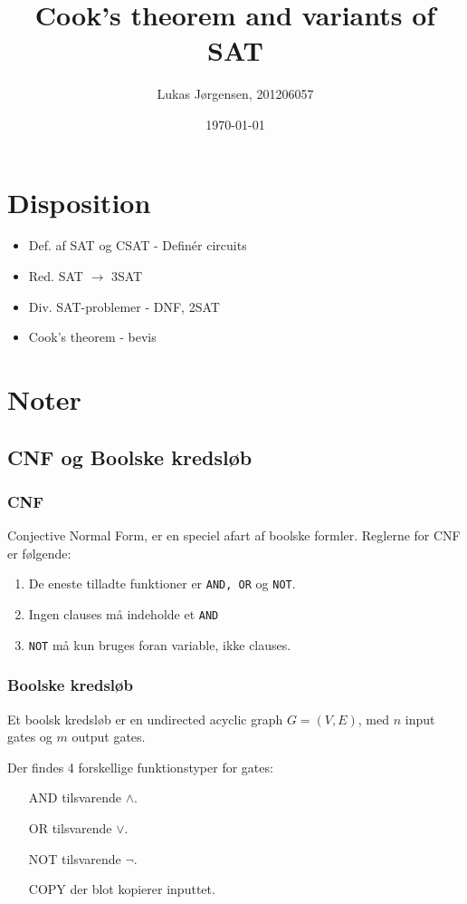 \documentclass[danish,a4paper,article,12pt]{article}
\title{Cook's theorem and variants of SAT}
\author{Lukas Jørgensen, 201206057
	}
\date{\today}
\begin{document}
\maketitle

\section{Disposition}
\begin{itemize}
\item Def. af SAT og CSAT - Definér circuits
\item Red. SAT $\rightarrow$ 3SAT
\item Div. SAT-problemer - DNF, 2SAT
\item Cook's theorem - bevis
\end{itemize}

\section{Noter}
\subsection{CNF og Boolske kredsløb}

\subsubsection{CNF}
Conjective Normal Form, er en speciel afart af boolske formler. Reglerne for CNF er følgende:

\begin{enumerate}
\item De eneste tilladte funktioner er \texttt{AND, OR} og \texttt{NOT}.
\item Ingen clauses må indeholde et \texttt{AND}
\item \texttt{NOT} må kun bruges foran variable, ikke clauses.
\end{enumerate}

\subsubsection{Boolske kredsløb}
Et boolsk kredsløb er en undirected acyclic graph $G=(V,E)$, med $n$ input gates og $m$ output gates.

Der findes 4 forskellige funktionstyper for gates:
\begin{itemize}
\item[AND] tilsvarende $\wedge$.
\item[OR] tilsvarende $\vee$.
\item[NOT] tilsvarende $\neg$.
\item[COPY] der blot kopierer inputtet.
\end{itemize}
\end{document}
